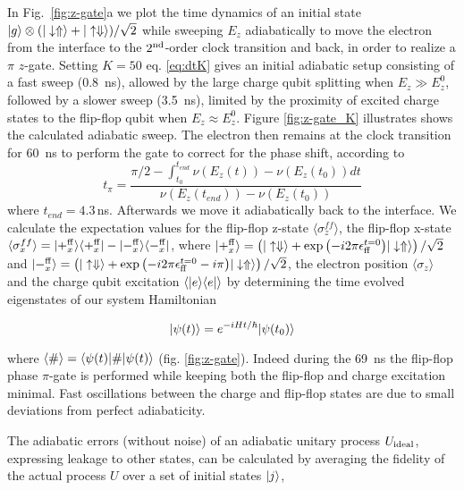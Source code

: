 In Fig.~\ref{fig:z-gate}a we plot the time dynamics of an initial state $|g\rangle\otimes(|\downarrow\Uparrow\rangle+|\uparrow\Downarrow\rangle)/\sqrt{2}$ while sweeping $E_z$ adiabatically to move the electron from the interface to the $2^{\rm nd}$-order clock transition and back, in order to realize a $\pi$ $z$-gate. Setting $K=50$ eq. \ref{eq:dtK} gives an initial adiabatic setup consisting of a fast sweep (0.8~ns), allowed by the large charge qubit splitting when $E_z \gg E_z^0$, followed by a slower sweep (3.5~ns), limited by the proximity of excited charge states to the flip-flop qubit when $E_z \approx E_z^0$. Figure \ref{fig:z-gate_K} illustrates shows the calculated adiabatic sweep. The electron then remains at the clock transition for 60~ns to perform the gate to correct for the phase shift, according to 
\begin{equation}
t_{\pi}=\frac{\pi/2-\int_{t_0}^{t_{end}} \nu(E_z(t))-\nu(E_z(t_0))dt}{\nu (E_z(t_{end}))-\nu(E_z(t_0))}
\end{equation} 
where $t_{end}=4.3\,$ns. Afterwards we move it adiabatically back to the interface. We calculate the expectation values for the flip-flop z-state $\langle \sigma_z^{ff}\rangle$, the flip-flop x-state $\langle \sigma_x^{ff}\rangle=|+_x^{\rm ff}\rangle\langle +_x^{\rm ff}|-|-_x^{\rm ff}\rangle\langle -_x^{\rm ff}|$, where $|+_x^{\rm ff}\rangle=\left(|\uparrow\Downarrow\rangle+\exp{\left(-i2\pi\epsilon_{\rm ff}^{t=0}\right)}|\downarrow\Uparrow\rangle\right)/\sqrt{2}$ and $|-_x^{\rm ff}\rangle=\left(|\uparrow\Downarrow\rangle+\exp{\left(-i2\pi\epsilon_{\rm ff}^{t=0}-i\pi\right)}|\downarrow\Uparrow\rangle\right)/\sqrt{2}$, the electron position $\langle \sigma_z\rangle$ and the charge qubit excitation $\langle |e\rangle\langle e|\rangle$ by determining the time evolved eigenstates of our system Hamiltonian 

\begin{equation}
|\psi(t)\rangle=e^{-i H t/\hbar}|\psi(t_0)\rangle
\end{equation}

where $\langle \#\rangle=\langle \psi(t)|\#|\psi(t)\rangle$ (fig. \ref{fig:z-gate}). Indeed during the 69~ns the flip-flop phase $\pi$-gate is performed while keeping both the flip-flop and charge excitation minimal. Fast oscillations between the charge and flip-flop states are due to small deviations from perfect adiabaticity. 

The adiabatic errors (without noise) of an adiabatic unitary process $U_{\rm ideal}$, expressing leakage to other states, can be calculated by averaging the fidelity of the actual process $U$ over a set of initial states $|j\rangle$,

